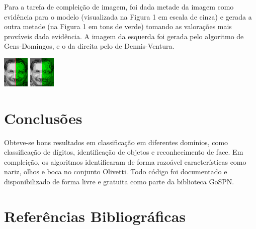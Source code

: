 \documentclass[10pt,a4paper]{article}
\newenvironment{Figure}
  {\par\smallskip\noindent\minipage{\linewidth}}
  {\endminipage\smallskip\par}
\begin{document}
\begin{multicols*}{2}
Para a tarefa de compleição de imagem, foi dada metade da imagem como evidência para o modelo
(visualizada na Figura 1 em escala de cinza) e gerada a outra metade (na Figura 1 em tons de
verde) tomando as valorações mais prováveis dada evidência. A imagem da esquerda foi gerada pelo
algoritmo de Gens-Domingos, e o da direita pelo de Dennis-Ventura.
\begin{Figure}
  \centering\includegraphics[scale=8.0]{imgs/gens_cmpl.png}
  \includegraphics[scale=1.925]{imgs/dennis_cmpl.png}\\
  \vspace{-0.2cm}
\end{Figure}

\section*{Conclusões}

Obteve-se bons resultados em classificação em diferentes domínios, como classificação de dígitos,
identificação de objetos e reconhecimento de face. Em compleição, os algoritmos identificaram
de forma razoável características como nariz, olhos e boca no conjunto Olivetti. Todo código foi
documentado e disponibilizado de forma livre e gratuita como parte da biblioteca GoSPN\@.

\smallskip
\section*{Referências Bibliográficas}
\vspace{0.1cm}

\AtNextBibliography{\fontsize{10pt}{12.0}\selectfont}
\printbibliography[heading=none]

\end{multicols*}
\end{document}
